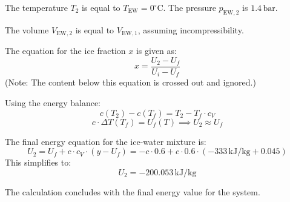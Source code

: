 The temperature \( T_2 \) is equal to \( T_{\text{EW}} = 0^\circ\text{C} \). The pressure \( p_{\text{EW},2} \) is \( 1.4 \, \text{bar} \).  

The volume \( V_{\text{EW},2} \) is equal to \( V_{\text{EW},1} \), assuming incompressibility.  

The equation for the ice fraction \( x \) is given as:  
\[
x = \frac{U_2 - U_f}{U_i - U_f}
\]  
(Note: The content below this equation is crossed out and ignored.)  

Using the energy balance:  
\[
c(T_2) - c(T_f) = T_2 - T_f \cdot c_V
\]  
\[
c \cdot \Delta T(T_f) = U_f(T) \implies U_2 \approx U_f
\]  

The final energy equation for the ice-water mixture is:  
\[
U_2 = U_f + c \cdot c_V \cdot (y - U_f) = -c \cdot 0.6 + c \cdot 0.6 \cdot (-333 \, \text{kJ/kg} + 0.045)
\]  
This simplifies to:  
\[
U_2 = -200.053 \, \text{kJ/kg}
\]  

The calculation concludes with the final energy value for the system.